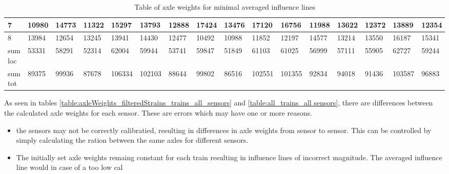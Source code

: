 \begin{table}[h]
\begin{adjustbox}{center}
\begin{tabularx}{\pagewidth}{ |X|X|X|X|X|X|X|X|X|X|X|X|X|X|X|X| }
			\hline
			7 & 10980   &    14773   &    11322   &    15297   &    13793   &    12888    &   17424    &   13476    &   17120   &    16756   &    11988   &    13622   &    12372   &    13889 & 12354 \\
			\hline
			8 & 13984   &    12654   &    13245   &    13941   &    14430   &    12477    &   10492    &   10988    &   11852   &    12197   &    14577   &    13214   &    13550   &    16187 & 15341 \\
			\hline
			sum loc & 53331   &    58291   &    52314   &    62004   &    59944   &    53741    &   59847    &   51849    &   61103   &    61025   &    56999   &    57111   &    55905   &   62727 & 59244 \\
			\hline
			sum tot & 89375   &    99936   &    87678   &   106334   &   102103   &    88644    &   99802    &   86516    &  102551   &   101355   &    92834   &    94018   &    91436   &   103587 & 96883 \\
			\hline
		\end{tabularx}
	\end{adjustbox}
	\caption{Table of axle weights for minimal averaged influence lines}
	\label{table:axleWeights_for_minimalInfl}
\end{table}
As seen in tables \ref{table:axleWeights_filteredStrains_trains_all_sensors} and \ref{table:all_trains_all sensors}, there are differences between the calculated axle weights for each sensor. These are errors which may have one or more reasons.
\begin{itemize}
	\item the sensors may not be correctly calibratied, resulting in differences in axle weights from sensor to sensor. This can be controlled by simply calculating the ration between the same axles for different sensors.
	\item The initially set axle weights remaing constant for each train resulting in influence lines of incorrect magnitude. The averaged influence line would in case of a too low cal
\end{itemize}

